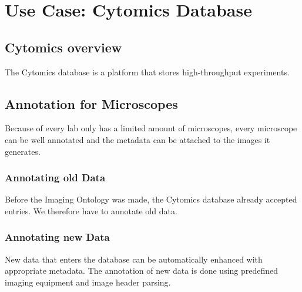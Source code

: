 
\chapter{Use Case: Cytomics Database} %

\label{Chapter5} %



\section{Cytomics overview}

The Cytomics database is a platform
that stores high-throughput experiments.


\section{Annotation for Microscopes}

Because of every lab only has a limited amount of
microscopes, every microscope can be well
annotated and the metadata can be
attached to the images it generates.


\subsection{Annotating old Data}

Before the Imaging Ontology was made, the
Cytomics database already accepted entries. We therefore have to annotate old data.


\subsection{Annotating new Data}

New data that enters the database can be automatically enhanced with
appropriate metadata. The
annotation of new data is done using
predefined imaging equipment and image header
parsing.
